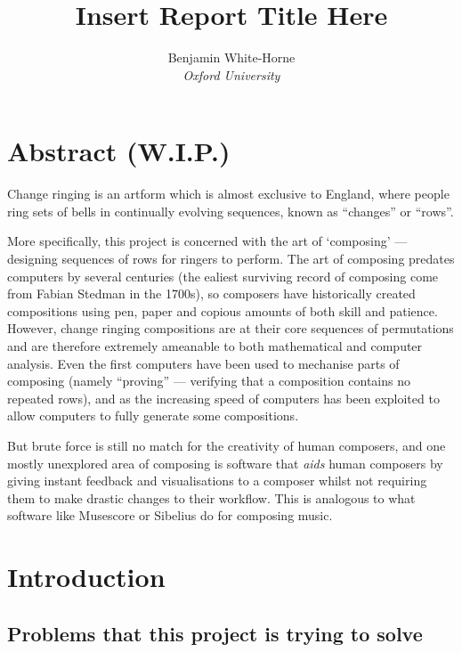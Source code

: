 \documentclass[12pt]{article}
\title{Insert Report Title Here}
\author{Benjamin White-Horne \\ \emph{Oxford University}}
\begin{document}
\maketitle

\pagebreak

\section*{Abstract (W.I.P.)}

Change ringing is an artform which is almost exclusive to England, where people ring sets of bells
in continually evolving sequences, known as ``changes'' or ``rows''.  

More specifically, this project is concerned with the art of `composing' --- designing sequences of
rows for ringers to perform.  The art of composing predates computers by several centuries (the
ealiest surviving record of composing come from Fabian Stedman in the 1700s), so composers have
historically created compositions using pen, paper and copious amounts of both skill and patience.
However, change ringing compositions are at their core sequences of permutations and are therefore
extremely ameanable to both mathematical and computer analysis.  Even the first computers have been
used to mechanise parts of composing (namely ``proving'' --- verifying that a composition contains
no repeated rows), and as the increasing speed of computers has been exploited to allow computers to
fully generate some compositions.

But brute force is still no match for the creativity of human composers, and one mostly unexplored area
of composing is software that \emph{aids} human composers by giving instant feedback and
visualisations to a composer whilst not requiring them to make drastic changes to their workflow.
This is analogous to what software like Musescore or Sibelius do for composing music.

\pagebreak

\tableofcontents

\pagebreak

\section{Introduction}

\iffalse

\subsection{Problems that this project is trying to solve}
\end{document}
